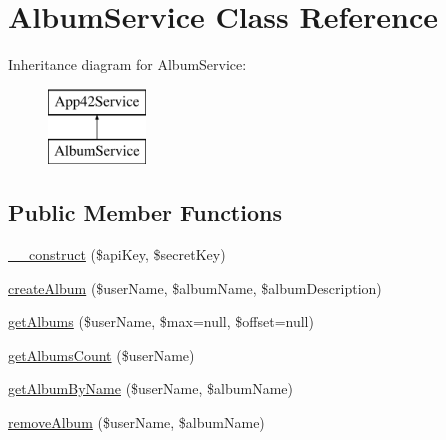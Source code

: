 \hypertarget{class_album_service}{\section{Album\+Service Class Reference}
\label{class_album_service}
}
Inheritance diagram for Album\+Service\+:\begin{figure}[H]
\begin{center}
\leavevmode
\includegraphics[height=2.000000cm]{class_album_service}
\end{center}
\end{figure}
\subsection*{Public Member Functions}
\begin{DoxyCompactItemize}
\item 
\hyperlink{class_album_service_a49f2ad222e06420736d750e167d55d7c}{\+\_\+\+\_\+construct} (\$api\+Key, \$secret\+Key)
\item 
\hyperlink{class_album_service_a80a4a52fd7cb754bd477ec7711fd37c3}{create\+Album} (\$user\+Name, \$album\+Name, \$album\+Description)
\item 
\hyperlink{class_album_service_a55169ec09c147666edf8dfcf195fc378}{get\+Albums} (\$user\+Name, \$max=null, \$offset=null)
\item 
\hyperlink{class_album_service_abfbf081d8b32a13cd875cc679848f668}{get\+Albums\+Count} (\$user\+Name)
\item 
\hyperlink{class_album_service_a20cec6fa0702d575a9395857f964b51e}{get\+Album\+By\+Name} (\$user\+Name, \$album\+Name)
\item 
\hyperlink{class_album_service_ad049f1b9bc0888281203c364c1fdcd61}{remove\+Album} (\$user\+Name, \$album\+Name)
\end{DoxyCompactItemize}
